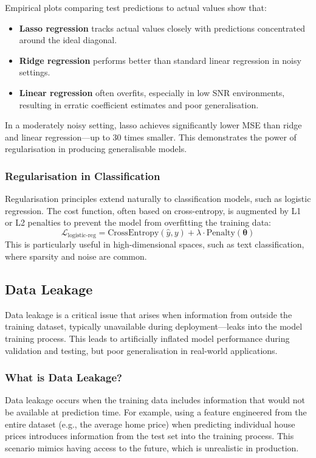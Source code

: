 \documentclass[9pt]{extarticle}
\begin{document}
Empirical plots comparing test predictions to actual values show that:
\begin{itemize}
    \item \textbf{Lasso regression} tracks actual values closely with predictions concentrated around the ideal diagonal.
    \item \textbf{Ridge regression} performs better than standard linear regression in noisy settings.
    \item \textbf{Linear regression} often overfits, especially in low SNR environments, resulting in erratic coefficient estimates and poor generalisation.
\end{itemize}

In a moderately noisy setting, lasso achieves significantly lower MSE than ridge and linear regression—up to 30 times smaller. This demonstrates the power of regularisation in producing generalisable models.

\subsubsection*{Regularisation in Classification}

Regularisation principles extend naturally to classification models, such as logistic regression. The cost function, often based on cross-entropy, is augmented by L1 or L2 penalties to prevent the model from overfitting the training data:
\[
\mathcal{L}_{\text{logistic-reg}} = \text{CrossEntropy}(\hat{y}, y) + \lambda \cdot \text{Penalty}(\boldsymbol{\theta})
\]
This is particularly useful in high-dimensional spaces, such as text classification, where sparsity and noise are common.
\subsection{Data Leakage}

Data leakage is a critical issue that arises when information from outside the 
training dataset, typically unavailable during deployment—leaks into the model training process. This leads to artificially inflated model performance during validation and testing, but poor generalisation in real-world applications.

\subsubsection*{What is Data Leakage?}

Data leakage occurs when the training data includes information that would not be available at prediction time. For example, using a feature engineered from the entire dataset (e.g., the average home price) when predicting individual house prices introduces information from the test set into the training process. This scenario mimics having access to the future, which is unrealistic in production.
\end{document}
